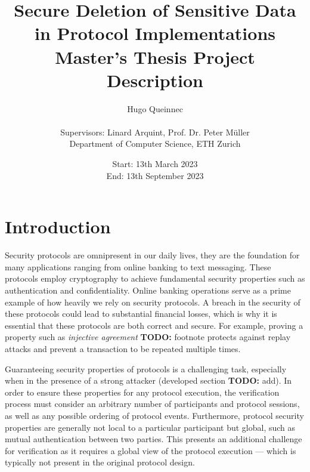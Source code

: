 \documentclass{article}
\title{Secure Deletion of Sensitive Data in Protocol Implementations\\
{\large Master's Thesis Project Description}}
\author{Hugo Queinnec \\ \\ Supervisors: Linard Arquint, Prof. Dr. Peter Müller \\
Department of Computer Science, ETH Zurich}
\date{Start: 13th March 2023 \\
      End: 13th September 2023 \\
      \TODO{Update the dates in the final version.}}
\newcommand{\TODO}[1]{\textcolor{RedViolet}{\textbf{TODO:} #1}}
\begin{document}
\maketitle

\thispagestyle{plain}
\pagestyle{plain}


\section{Introduction}

Security protocols are omnipresent in our daily lives, they are the foundation for many applications ranging from online banking to text messaging. These protocols employ cryptography to achieve fundamental security properties such as authentication and confidentiality.
Online banking operations serve as a prime example of how heavily we rely on security protocols. A breach in the security of these protocols could lead to substantial financial losses, which is why it is essential that these protocols are both correct and secure. For example, proving a property such as \textit{injective agreement} \TODO{footnote} protects against replay attacks and prevent a transaction to be repeated multiple times.

Guaranteeing security properties of protocols is a challenging task, especially when in the presence of a strong attacker (developed section \TODO{add}). In order to ensure these properties for any protocol execution, the verification process must consider an arbitrary number of participants and protocol sessions, as well as any possible ordering of protocol events. Furthermore, protocol security properties are generally not local to a particular participant but global, such as mutual authentication between two parties. This presents an additional challenge for verification as it requires a global view of the protocol execution — which is typically not present in the original protocol design.
\end{document}
